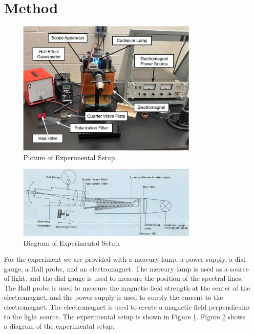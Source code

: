 
\section{Method}
\label{sec:method}

\begin{figure}
    \centering
    \includegraphics[width=0.8\textwidth]{method/labeled_diagram.jpg}
    \caption{Picture of Experimental Setup.}
    \label{fig:exp_setup}
\end{figure}

\begin{figure}
    \centering
    \includegraphics[width=0.8\textwidth]{method/setup_diagram.png}
    \caption{Diagram of Experimental Setup. \cite{ZeemanEffectLab}}
    \label{fig:diagram_setup}
\end{figure}

For the experiment we are provided with a mercury lamp, a power supply, a dial gauge, a Hall probe, and an electromagnet. The mercury lamp is used as a source of light, and the dial gauge is used to measure the position of the spectral lines. The Hall probe is used to measure the magnetic field strength at the center of the electromagnet, and the power supply is used to supply the current to the electromagnet. The electromagnet is used to create a magnetic field perpendicular to the light source. The experimental setup is shown in Figure \ref{fig:exp_setup}.
Figure \ref{fig:diagram_setup} shows a diagram of the experimental setup.

